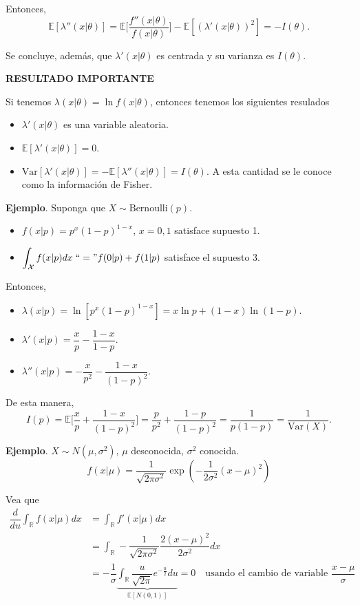 \documentclass[
  12pt,
]{book}
\providecommand{\tightlist}{%
  \setlength{\itemsep}{0pt}\setlength{\parskip}{0pt}}
\begin{document}
Entonces,
\[\mathbb E[\lambda''(x|\theta)] =\mathbb E\bigg[\dfrac{f''(x|\theta)}{f(x|\theta)} \bigg] - \mathbb E[(\lambda'(x|\theta))^2] = -I(\theta). \]

Se concluye, además, que \(\lambda'(x|\theta)\) es centrada y su varianza es \(I(\theta)\).

\textbf{RESULTADO IMPORTANTE}

Si tenemos \(\lambda(x\vert \theta) = \ln f(x\vert \theta)\), entonces tenemos los siguientes resulados

\begin{itemize}
\tightlist
\item
  \(\lambda'(x\vert \theta)\) es una variable aleatoria.
\item
  \(\mathbb{E}[\lambda'(x\vert \theta)] =0\).
\item
  \(\mathrm{Var}[\lambda'(x\vert \theta)] = - \mathbb E[\lambda''(x|\theta)] = I(\theta)\). A esta cantidad se le conoce como la información de Fisher.
\end{itemize}

\textbf{Ejemplo}. Suponga que \(X\sim \text{Bernoulli}(p)\).

\begin{itemize}
\item
  \(f(x|p) = p^x(1-p)^{1-x}\), \(x=0,1\) satisface supuesto 1.
\item
  \(\displaystyle\int_{\mathcal X}f(x|p)dx \;``=" f(0|p)+f(1|p)\) satisface el supuesto 3.
\end{itemize}

Entonces,

\begin{itemize}
\item
  \(\lambda(x|p) = \ln[p^x(1-p)^{1-x}] = x\ln p + (1-x)\ln(1-p)\).
\item
  \(\lambda'(x|p) = \dfrac xp-\dfrac{1-x}{1-p}\).
\item
  \(\lambda''(x|p) = -\dfrac x{p^2}-\dfrac{1-x}{(1-p)^2}\).
\end{itemize}

De esta manera,
\[I(p) = \mathbb E\bigg[\dfrac xp + \dfrac{1-x}{(1-p)^2}\bigg] = \dfrac p{p^2}+\dfrac{1-p}{(1-p)^2} = \dfrac 1{p(1-p)} = \dfrac 1{\text{Var}(X)}.\]

\textbf{Ejemplo}. \(X\sim N(\mu,\sigma^2)\), \(\mu\) desconocida, \(\sigma^2\) conocida.
\[f(x|\mu) = \dfrac{1}{\sqrt{2\pi\sigma^2}}\exp\left(-\dfrac 1{2\sigma^2}(x-\mu)^2\right)\]

Vea que
\begin{align*}
\dfrac d{du}\int_{\mathbb R} f(x|\mu)dx & = \int_{\mathbb R}f'(x|\mu)dx\\
& = \int_{\mathbb R} -\dfrac 1{\sqrt{2\pi\sigma^2}}\dfrac {2(x-\mu)^2}{2\sigma^2} dx\\
& = -\dfrac 1\sigma \underbrace{\int_{\mathbb R}\dfrac{u}{\sqrt{2\pi}}e^{-\frac{u}2}du}_{\mathbb E[N(0,1)]} = 0 \quad \text{usando el cambio de variable } \dfrac{x-\mu}\sigma
\end{align*}
\end{document}
